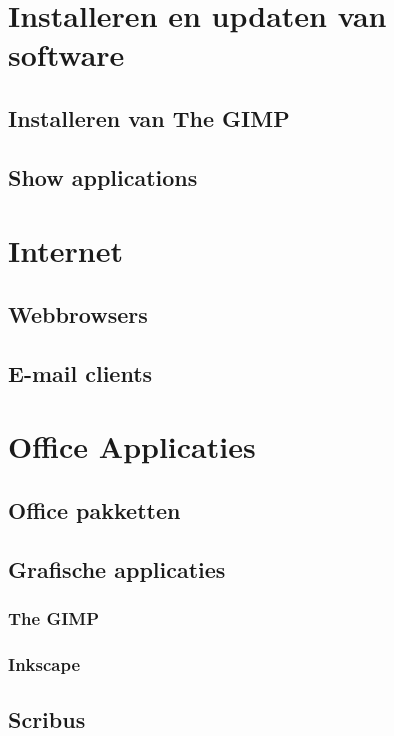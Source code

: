\documentclass[a4paper,12pt,twoside,openright,titlepage]{book}
\begin{document}
\chapter{Installeren en updaten van software}

\section{Installeren van The GIMP}

\section{Show applications}


\chapter{Internet}
\section{Webbrowsers}

\section{E-mail clients}


\chapter{Office Applicaties}
\section{Office pakketten}

\section{Grafische applicaties}

\subsection{The GIMP}

\subsection{Inkscape}

\section{Scribus}

\end{document}
